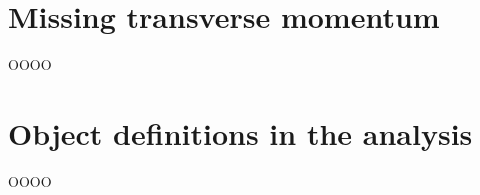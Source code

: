 \section{Missing transverse momentum}
\label{heading:Chapter6-section4-1}

OOOO

\section{Object definitions in the analysis}
\label{heading:Chapter6-section4-2}

OOOO

